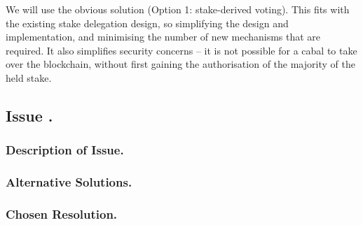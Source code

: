 We will use the obvious solution (Option 1: stake-derived voting).  This fits
with the existing stake delegation design, so simplifying the design and
implementation, and minimising the number of new mechanisms that are required.
It also simplifies security concerns -- it is not possible for a cabal to take
over the blockchain, without first gaining the authorisation of the majority of
the held stake.

\subsection*{Issue \theissue{}.}

\subsubsection*{Description of Issue.}

\subsubsection*{Alternative Solutions.}

\subsubsection*{Chosen Resolution.}

\pagebreak
